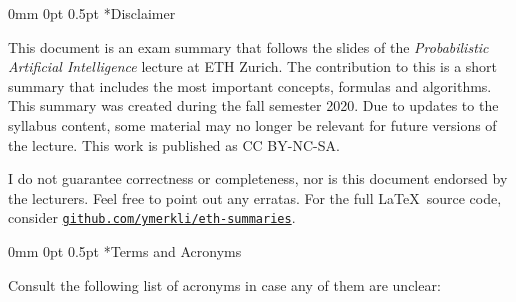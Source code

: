 \documentclass[11pt,landscape,a4paper,fleqn]{article}
\makeatletter
\renewcommand{\section}{\@startsection{section}{1}%
								{0mm}%
                                {0pt}%
                                {0.5pt}%
                                {\color{myorange}\sffamily\small\bfseries}}
\makeatother
\begin{document}
\small
\begin{multicols*}{4}

	\section*{Disclaimer}

	This document is an exam summary that follows the slides of the \textit{Probabilistic Artificial Intelligence} lecture  at ETH Zurich. The contribution to this is a short summary that includes the most important concepts, formulas and algorithms. This summary was created during the fall semester 2020. Due to updates to the syllabus content, some material may no longer be relevant for future versions of the lecture. This work is published as CC BY-NC-SA.

	\begin{center}
		\ccbyncsa
	\end{center}

	I do not guarantee correctness or completeness, nor is this document endorsed by the lecturers. Feel free to point out any erratas. For the full \LaTeX \ source code, consider \texttt{\href{https://github.com/ymerkli/eth-summaries}{github.com/ymerkli/eth-summaries}}.

	\vspace*{140mm}

	\columnbreak

	\section*{Terms and Acronyms}

	Consult the following list of acronyms in case any of them are unclear:\\


\end{multicols*}
\end{document}
